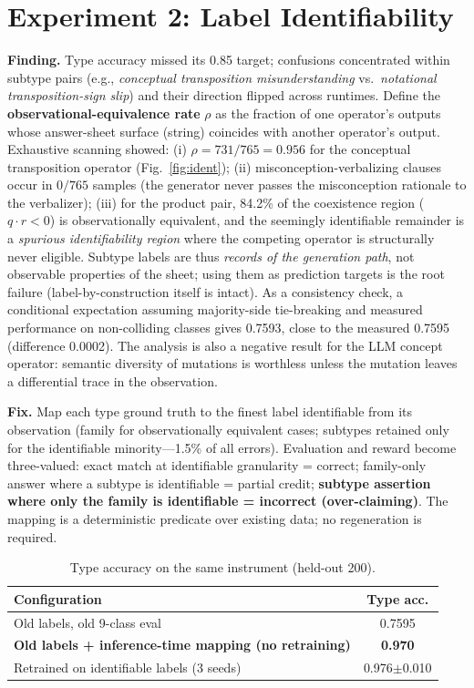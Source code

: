 \documentclass[11pt]{article}
\begin{document}
\section{Experiment 2: Label Identifiability}\label{sec:exp2}
\textbf{Finding.} Type accuracy missed its 0.85 target; confusions concentrated within subtype pairs (e.g., \emph{conceptual transposition misunderstanding} vs.\ \emph{notational transposition-sign slip}) and their direction flipped across runtimes. Define the \textbf{observational-equivalence rate} $\rho$ as the fraction of one operator's outputs whose answer-sheet surface (string) coincides with another operator's output. Exhaustive scanning showed: (i) $\rho = 731/765 = 0.956$ for the conceptual transposition operator (Fig.~\ref{fig:ident}); (ii) misconception-verbalizing clauses occur in $0/765$ samples (the generator never passes the misconception rationale to the verbalizer); (iii) for the product pair, 84.2\% of the coexistence region ($q\!\cdot\!r<0$) is observationally equivalent, and the seemingly identifiable remainder is a \emph{spurious identifiability region} where the competing operator is structurally never eligible. Subtype labels are thus \emph{records of the generation path}, not observable properties of the sheet; using them as prediction targets is the root failure (label-by-construction itself is intact). As a consistency check, a conditional expectation assuming majority-side tie-breaking and measured performance on non-colliding classes gives 0.7593, close to the measured 0.7595 (difference 0.0002). The analysis is also a negative result for the LLM concept operator: semantic diversity of mutations is worthless unless the mutation leaves a differential trace in the observation.

\textbf{Fix.} Map each type ground truth to the finest label identifiable from its observation (family for observationally equivalent cases; subtypes retained only for the identifiable minority---1.5\% of all errors). Evaluation and reward become three-valued: exact match at identifiable granularity = correct; family-only answer where a subtype is identifiable = partial credit; \textbf{subtype assertion where only the family is identifiable = incorrect (over-claiming)}. The mapping is a deterministic predicate over existing data; no regeneration is required.

\begin{table}[t]\centering\small
\caption{Type accuracy on the same instrument (held-out 200).}\label{tab:heldout}
\begin{tabular}{lc}\toprule
Configuration & Type acc.\\\midrule
Old labels, old 9-class eval & 0.7595\\
\textbf{Old labels + inference-time mapping (no retraining)} & \textbf{0.970}\\
Retrained on identifiable labels (3 seeds) & 0.976$\pm$0.010\\\bottomrule
\end{tabular}
\end{table}
\end{document}

